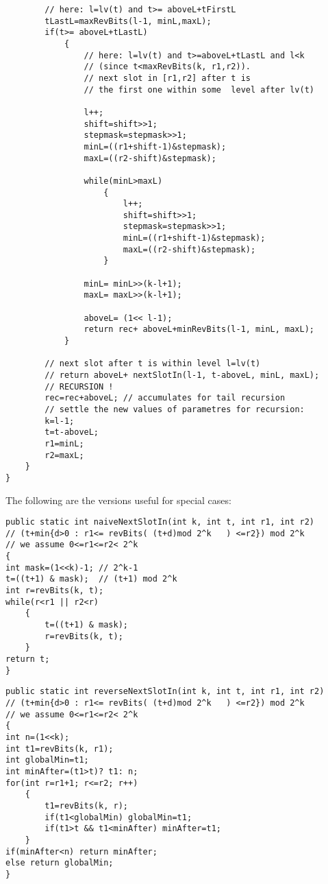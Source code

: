 \begin{verbatim}
        // here: l=lv(t) and t>= aboveL+tFirstL
        tLastL=maxRevBits(l-1, minL,maxL);
        if(t>= aboveL+tLastL)
            {
                // here: l=lv(t) and t>=aboveL+tLastL and l<k 
                // (since t<maxRevBits(k, r1,r2)).
                // next slot in [r1,r2] after t is 
                // the first one within some  level after lv(t)

                l++;
                shift=shift>>1;
                stepmask=stepmask>>1;
                minL=((r1+shift-1)&stepmask);
                maxL=((r2-shift)&stepmask);

                while(minL>maxL)
                    {
                        l++;
                        shift=shift>>1;
                        stepmask=stepmask>>1;
                        minL=((r1+shift-1)&stepmask);
                        maxL=((r2-shift)&stepmask);
                    }

                minL= minL>>(k-l+1);
                maxL= maxL>>(k-l+1);

                aboveL= (1<< l-1);
                return rec+ aboveL+minRevBits(l-1, minL, maxL);
            }

        // next slot after t is within level l=lv(t)
        // return aboveL+ nextSlotIn(l-1, t-aboveL, minL, maxL); 
        // RECURSION !
        rec=rec+aboveL; // accumulates for tail recursion
        // settle the new values of parametres for recursion:
        k=l-1;
        t=t-aboveL;
        r1=minL;
        r2=maxL;
    }
}
\end{verbatim}

The following are the versions useful for special cases:
\begin{verbatim}
public static int naiveNextSlotIn(int k, int t, int r1, int r2)
// (t+min{d>0 : r1<= revBits( (t+d)mod 2^k   ) <=r2}) mod 2^k 
// we assume 0<=r1<=r2< 2^k 
{
int mask=(1<<k)-1; // 2^k-1 
t=((t+1) & mask);  // (t+1) mod 2^k
int r=revBits(k, t);
while(r<r1 || r2<r)
    {
        t=((t+1) & mask);
        r=revBits(k, t);
    }
return t;
}
\end{verbatim}
\begin{verbatim}
public static int reverseNextSlotIn(int k, int t, int r1, int r2)
// (t+min{d>0 : r1<= revBits( (t+d)mod 2^k   ) <=r2}) mod 2^k 
// we assume 0<=r1<=r2< 2^k 
{
int n=(1<<k);
int t1=revBits(k, r1);
int globalMin=t1;
int minAfter=(t1>t)? t1: n;
for(int r=r1+1; r<=r2; r++)
    {
        t1=revBits(k, r);
        if(t1<globalMin) globalMin=t1;
        if(t1>t && t1<minAfter) minAfter=t1;
    }
if(minAfter<n) return minAfter;
else return globalMin; 
}
\end{verbatim}



